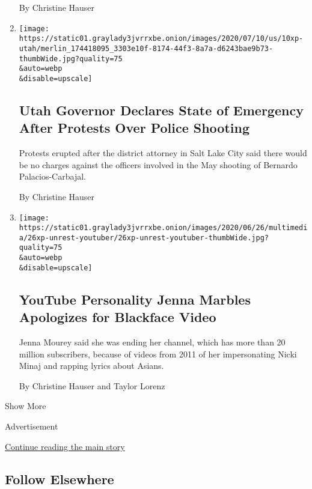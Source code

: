 \begin{enumerate}
  By Christine Hauser
\item
  \href{/2020/07/10/us/utah-state-of-emergency.html}{}

  \texttt{[image: https://static01.graylady3jvrrxbe.onion/images/2020/07/10/us/10xp-utah/merlin\_174418095\_3303e10f-8174-44f3-8a7a-d6243bae9b73-thumbWide.jpg?quality=75\\\&auto=webp\\\&disable=upscale]}

  \hypertarget{utah-governor-declares-state-of-emergency-after-protests-over-police-shooting}{%
  \subsection{Utah Governor Declares State of Emergency After Protests
  Over Police
  Shooting}\label{utah-governor-declares-state-of-emergency-after-protests-over-police-shooting}}

  Protests erupted after the district attorney in Salt Lake City said
  there would be no charges against the officers involved in the May
  shooting of Bernardo Palacios-Carbajal.

  By Christine Hauser
\item
  \href{/2020/06/26/us/jenna-marbles-leaves-youtube.html}{}

  \texttt{[image: https://static01.graylady3jvrrxbe.onion/images/2020/06/26/multimedia/26xp-unrest-youtuber/26xp-unrest-youtuber-thumbWide.jpg?quality=75\\\&auto=webp\\\&disable=upscale]}

  \hypertarget{youtube-personality-jenna-marbles-apologizes-for-blackface-video}{%
  \subsection{YouTube Personality Jenna Marbles Apologizes for Blackface
  Video}\label{youtube-personality-jenna-marbles-apologizes-for-blackface-video}}

  Jenna Mourey said she was ending her channel, which has more than 20
  million subscribers, because of videos from 2011 of her impersonating
  Nicki Minaj and rapping lyrics about Asians.

  By Christine Hauser and Taylor Lorenz
\end{enumerate}

Show More

Advertisement

\protect\hyperlink{after-mid2}{Continue reading the main story}

\hypertarget{follow-elsewhere}{%
\subsection{Follow Elsewhere}\label{follow-elsewhere}}

